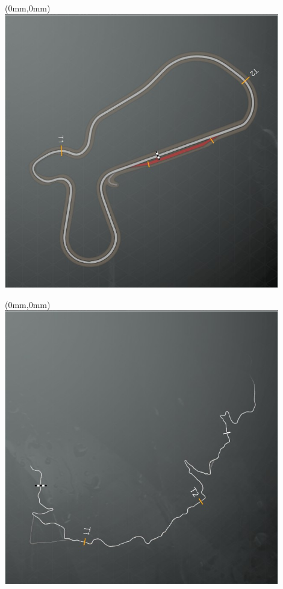 \null\newpage
\begin{textblock*}{30mm}(0mm,0mm)%
\includegraphics[width=120mm]{TR/2015-05-20_00068.png}
\end{textblock*}
\null\newpage
\begin{textblock*}{30mm}(0mm,0mm)%
\includegraphics[width=120mm]{TR/2015-05-20_00014.png}
\end{textblock*}

